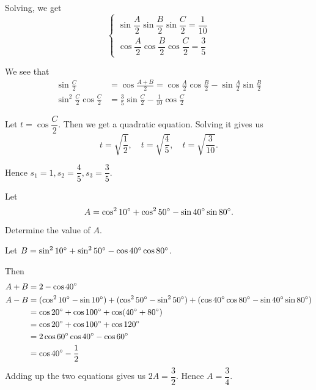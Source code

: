 \begin{solution}
Solving, we get
\[ \begin{cases}
\sin\dfrac{A}{2}\sin\dfrac{B}{2}\sin\dfrac{C}{2}=\dfrac{1}{10} \\
\cos\dfrac{A}{2}\cos\dfrac{B}{2}\cos\dfrac{C}{2}=\dfrac{3}{5}
\end{cases} \]

We see that
\begin{align*}
\sin\frac{C}{2} &= \cos\frac{A+B}{2} = \cos\frac{A}{2}\cos\frac{B}{2} - \sin\frac{A}{2}\sin\frac{B}{2} \\
\sin^2\frac{C}{2}\cos\frac{C}{2} &= \frac{3}{5}\sin\frac{C}{2} - \frac{1}{10}\cos\frac{C}{2}
\end{align*}

Let $t=\cos\dfrac{C}{2}$. Then we get a quadratic equation. Solving it gives us 
\[ t=\sqrt{\frac{1}{2}}, \quad t=\sqrt{\frac{4}{5}}, \quad t=\sqrt{\frac{3}{10}}. \]

Hence $\boxed{s_1=1, s_2=\dfrac{4}{5}, s_3=\dfrac{3}{5}}$.
\end{solution}
\pagebreak

\begin{prbm}
Let 
\[ A = \cos^2 10\degree+\cos^2 50\degree - \sin40\degree\sin80\degree. \]
Determine the value of $A$.
\end{prbm}
\begin{solution}
Let $B=\sin^210\degree+\sin^250\degree-\cos40\degree\cos80\degree$.

Then
\begin{align*}
A+B &= 2-\cos40\degree \\
A-B &= (\cos^210\degree-\sin10\degree) + (\cos^250\degree-\sin^250\degree) + (\cos40\degree\cos80\degree-\sin40\degree\sin80\degree) \\
&= \cos20\degree + \cos100\degree + \cos(40\degree+80\degree) \\
&= \cos20\degree + \cos100\degree + \cos120\degree \\
&= 2\cos60\degree\cos40\degree - \cos60\degree \\
&= \cos40\degree - \frac{1}{2}
\end{align*}
Adding up the two equations gives us $2A=\dfrac{3}{2}$. Hence $\boxed{A=\dfrac{3}{4}}$.
\end{solution}
\pagebreak

